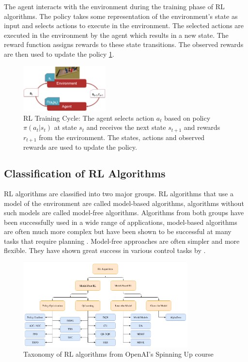 The agent interacts with the environment during the training phase of RL algorithms. The policy takes some representation of the environment's state as input and selects actions to execute in the environment. The selected actions are executed in the environment by the agent which results in a new state. The reward function assigns rewards to these state transitions.
The observed rewards are then used to update the policy \ref{fig:rlcycle}.

\begin{figure}
    \centering
    \includegraphics[width=0.4\textwidth]{Bilder/rl_cycle.png}
    \caption{RL Training Cycle: The agent selects action $a_t$ based on policy $\pi(a_t|s_t)$ at state $s_t$ and receives the next state $s_{t+1}$ and rewards $r_{t+1}$ from the environment. The states, actions and observed rewards are used to update the policy.}
    \label{fig:rlcycle}
\end{figure}

\subsection{Classification of \ac{RL} Algorithms}

\ac{RL} algorithms are classified into two major groups. RL algorithms that use a model of the environment are called model-based algorithms, algorithms without such models are called model-free algorithms. Algorithms from both groups have been successfully used in a wide range of applications, model-based algorithms are often much more complex but have been shown to be successful at many tasks that require planning \autocite{alphagoimprovementmuzero}. Model-free approaches are often simpler and more flexible. They have shown great success in various control tasks by \textcite{atari}.

\begin{figure}
    \centering
    \includegraphics[width=0.8\textwidth]{Bilder/openai_spinningup_taxonomy.png}
    \caption{Taxonomy of RL algorithms from OpenAI's Spinning Up course \autocite{spinningup}}
\end{figure}

